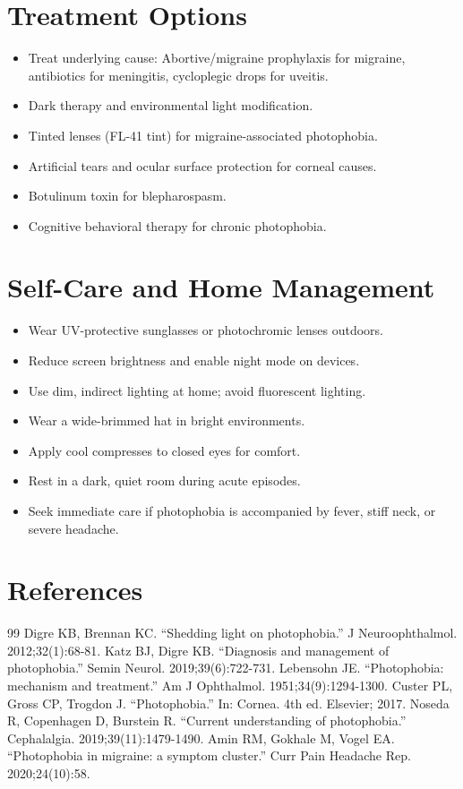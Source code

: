 \section*{Treatment Options}
\begin{itemize}
  \item Treat underlying cause: Abortive/migraine prophylaxis for migraine, antibiotics for meningitis, cycloplegic drops for uveitis.
  \item Dark therapy and environmental light modification.
  \item Tinted lenses (FL-41 tint) for migraine-associated photophobia.
  \item Artificial tears and ocular surface protection for corneal causes.
  \item Botulinum toxin for blepharospasm.
  \item Cognitive behavioral therapy for chronic photophobia.
\end{itemize}

\section*{Self-Care and Home Management}
\begin{itemize}
  \item Wear UV-protective sunglasses or photochromic lenses outdoors.
  \item Reduce screen brightness and enable night mode on devices.
  \item Use dim, indirect lighting at home; avoid fluorescent lighting.
  \item Wear a wide-brimmed hat in bright environments.
  \item Apply cool compresses to closed eyes for comfort.
  \item Rest in a dark, quiet room during acute episodes.
  \item Seek immediate care if photophobia is accompanied by fever, stiff neck, or severe headache.
\end{itemize}

\section*{References}
\begin{thebibliography}{99}
 Digre KB, Brennan KC. ``Shedding light on photophobia.'' J Neuroophthalmol. 2012;32(1):68-81.
 Katz BJ, Digre KB. ``Diagnosis and management of photophobia.'' Semin Neurol. 2019;39(6):722-731.
 Lebensohn JE. ``Photophobia: mechanism and treatment.'' Am J Ophthalmol. 1951;34(9):1294-1300.
 Custer PL, Gross CP, Trogdon J. ``Photophobia.'' In: Cornea. 4th ed. Elsevier; 2017.
 Noseda R, Copenhagen D, Burstein R. ``Current understanding of photophobia.'' Cephalalgia. 2019;39(11):1479-1490.
 Amin RM, Gokhale M, Vogel EA. ``Photophobia in migraine: a symptom cluster.'' Curr Pain Headache Rep. 2020;24(10):58.
\end{thebibliography}

